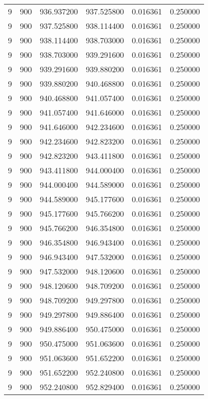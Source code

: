 \begin{longtable}{rrrrrr}
9 & 900 & 936.937200 & 937.525800 & 0.016361 & 0.250000 \\
9 & 900 & 937.525800 & 938.114400 & 0.016361 & 0.250000 \\
9 & 900 & 938.114400 & 938.703000 & 0.016361 & 0.250000 \\
9 & 900 & 938.703000 & 939.291600 & 0.016361 & 0.250000 \\
9 & 900 & 939.291600 & 939.880200 & 0.016361 & 0.250000 \\
9 & 900 & 939.880200 & 940.468800 & 0.016361 & 0.250000 \\
9 & 900 & 940.468800 & 941.057400 & 0.016361 & 0.250000 \\
9 & 900 & 941.057400 & 941.646000 & 0.016361 & 0.250000 \\
9 & 900 & 941.646000 & 942.234600 & 0.016361 & 0.250000 \\
9 & 900 & 942.234600 & 942.823200 & 0.016361 & 0.250000 \\
9 & 900 & 942.823200 & 943.411800 & 0.016361 & 0.250000 \\
9 & 900 & 943.411800 & 944.000400 & 0.016361 & 0.250000 \\
9 & 900 & 944.000400 & 944.589000 & 0.016361 & 0.250000 \\
9 & 900 & 944.589000 & 945.177600 & 0.016361 & 0.250000 \\
9 & 900 & 945.177600 & 945.766200 & 0.016361 & 0.250000 \\
9 & 900 & 945.766200 & 946.354800 & 0.016361 & 0.250000 \\
9 & 900 & 946.354800 & 946.943400 & 0.016361 & 0.250000 \\
9 & 900 & 946.943400 & 947.532000 & 0.016361 & 0.250000 \\
9 & 900 & 947.532000 & 948.120600 & 0.016361 & 0.250000 \\
9 & 900 & 948.120600 & 948.709200 & 0.016361 & 0.250000 \\
9 & 900 & 948.709200 & 949.297800 & 0.016361 & 0.250000 \\
9 & 900 & 949.297800 & 949.886400 & 0.016361 & 0.250000 \\
9 & 900 & 949.886400 & 950.475000 & 0.016361 & 0.250000 \\
9 & 900 & 950.475000 & 951.063600 & 0.016361 & 0.250000 \\
9 & 900 & 951.063600 & 951.652200 & 0.016361 & 0.250000 \\
9 & 900 & 951.652200 & 952.240800 & 0.016361 & 0.250000 \\
9 & 900 & 952.240800 & 952.829400 & 0.016361 & 0.250000 \\

\end{longtable}
